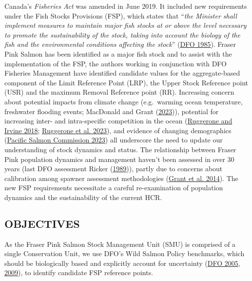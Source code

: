 \documentclass[11pt]{book}
\begin{document}
Canada's \emph{Fisheries Act} was amended in June 2019. It included new requirements under the Fish Stocks Provisions (FSP), which states that ``\emph{the Minister shall implement measures to maintain major fish stocks at or above the level necessary to promote the sustainability of the stock, taking into account the biology of the fish and the environmental conditions affecting the stock}'' (\protect\hyperlink{ref-DFO1985Act}{DFO 1985}). Fraser Pink Salmon has been identified as a major fish stock and to assist with the implementation of the FSP, the authors working in conjunction with DFO Fisheries Management have identified candidate values for the aggregate-based component of the Limit Reference Point (LRP), the Upper Stock Reference point (USR) and the maximum Removal Reference point (RR). Increasing concern about potential impacts from climate change (e.g.~warming ocean temperature, freshwater flooding events; MacDonald and Grant (\protect\hyperlink{ref-macdonaldStateCanadianPacific2023}{2023})), potential for increasing inter- and intra-specific competition in the ocean (\protect\hyperlink{ref-ruggeroneNumbersBiomassNatural2018}{Ruggerone and Irvine 2018}; \protect\hyperlink{ref-ruggeroneDiatomsKillerWhales2023}{Ruggerone et al. 2023}), and evidence of changing demographics (\protect\hyperlink{ref-pacificsalmoncommissionPSCBiologicalData2023}{Pacific Salmon Commission 2023}) all underscore the need to update our understanding of stock dynamics and status. The relationship between Fraser Pink population dynamics and management haven't been assessed in over 30 years (last DFO assessment Ricker (\protect\hyperlink{ref-rickerHistoryPresentState1989}{1989})), partly due to concerns about calibration among spawner assessment methodologies (\protect\hyperlink{ref-grantFraserRiverPink2014}{Grant et al. 2014}). The new FSP requirements necessitate a careful re-examination of population dynamics and the sustainability of the current HCR.

\hypertarget{objectives}{%
\subsection{OBJECTIVES}\label{objectives}}

As the Fraser Pink Salmon Stock Management Unit (SMU) is comprised of a single Conservation Unit, we use DFO's Wild Salmon Policy benchmarks, which should be biologically based and explicitly account for uncertainty (\protect\hyperlink{ref-dfoCanadaPolicyConservation2005}{DFO 2005}, \protect\hyperlink{ref-dfoFisheryDecisionmakingFramework2009}{2009}), to identify candidate FSP reference points.
\end{document}

